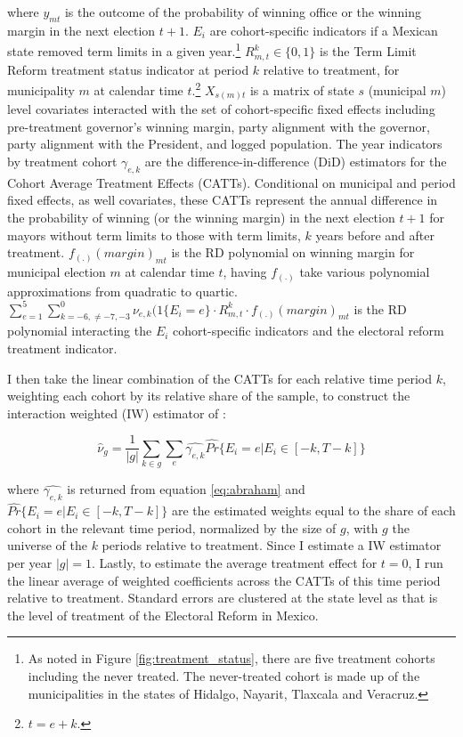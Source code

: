 \documentclass[12pt]{amsart}
\numberwithin{equation}{section}
\theoremstyle{definition}
\theoremstyle{definition}
\theoremstyle{definition}
\begin{document}
where $y_{mt}$ is the outcome of the probability of winning office or the winning margin in the next election $t+1$. $E_i$ are cohort-specific indicators if a Mexican state removed term limits in a given year.\footnote{As noted in Figure \ref{fig:treatment_status}, there are five treatment cohorts including the never treated. The never-treated cohort is made up of the municipalities in the states of Hidalgo, Nayarit, Tlaxcala and Veracruz.} $R^k_{m,t}\in \{0,1\}$  is the Term Limit Reform treatment status indicator at period $k$ relative to treatment, for municipality $m$ at calendar time $t$.\footnote{$t=e+k$.} $X_{s(m)t}$ is a matrix of state $s$ (municipal $m$) level covariates interacted with the set of cohort-specific fixed effects including pre-treatment governor's winning margin, party alignment with the governor, party alignment with the President, and logged population.  The year indicators by treatment cohort  $\gamma_{e,k}$ are the difference-in-difference (DiD) estimators for the Cohort Average Treatment Effects (CATTs). Conditional on municipal and period fixed effects, as well covariates, these CATTs represent the annual difference in the probability of winning (or the winning margin) in the next election $t+1$ for mayors without term limits to those with term limits, $k$ years before and after treatment. $f_{(.)}(margin)_{mt}$ is the RD polynomial on winning margin for municipal election $m$ at calendar time $t$, having $f_{(.)}$ take various polynomial approximations from quadratic to quartic. $\sum^5_{e=1} \sum^{0}_{k=-6, \neq {-7,-3}} \nu_{e,k}(1\{E_i=e\} \cdot R^k_{m,t} \cdot  f_{(.)}(margin)_{mt}  $ is the RD polynomial interacting the $E_i$ cohort-specific indicators and the electoral reform treatment indicator. 

I then take the linear combination of the CATTs for each relative time period $k$, weighting each cohort by its relative share of the sample, to construct the interaction weighted (IW) estimator of \citet{abraham_sun_2020}:   

\begin{equation}
\hat{\nu}_g=\frac{1}{|g|}\sum_{k \in g}\sum_e \hat{\gamma_{e,k}} \hat{Pr}\{E_i=e | E_i \in [-k, T-k]\}	
\end{equation}
  
where $\hat{\gamma_{e,k}}$ is returned from equation \ref{eq:abraham} and $\hat{Pr}\{E_i=e | E_i \in [-k, T-k]\}$  are the estimated weights equal to the share of each cohort in the relevant time period, normalized by the size of  $g$, with $g$ the universe of the $k$ periods relative to treatment. Since I estimate a IW estimator per year $|g|=1$. Lastly, to estimate the average treatment effect for $t=0$, I run the linear average of weighted coefficients across the CATTs of this time period relative to treatment.  Standard errors are clustered at the state level as that is the level of treatment of the Electoral Reform in Mexico. 
        
\end{document}
